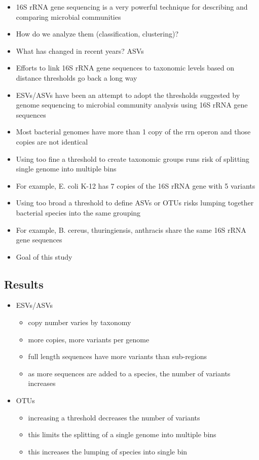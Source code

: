 \documentclass[
]{article}
\providecommand{\tightlist}{%
  \setlength{\itemsep}{0pt}\setlength{\parskip}{0pt}}
\begin{document}
\begin{itemize}
\item
  16S rRNA gene sequencing is a very powerful technique for describing
  and comparing microbial communities
\item
  How do we analyze them (classification, clustering)?
\item
  What has changed in recent years? ASVs
\item
  Efforts to link 16S rRNA gene sequences to taxonomic levels based on
  distance thresholds go back a long way
\item
  ESVs/ASVs have been an attempt to adopt the thresholds suggested by
  genome sequencing to microbial community analysis using 16S rRNA gene
  sequences
\item
  Most bacterial genomes have more than 1 copy of the rrn operon and
  those copies are not identical
\item
  Using too fine a threshold to create taxonomic groups runs risk of
  splitting single genome into multiple bins
\item
  For example, E. coli K-12 has 7 copies of the 16S rRNA gene with 5
  variants
\item
  Using too broad a threshold to define ASVs or OTUs risks lumping
  together bacterial species into the same grouping
\item
  For example, B. cereus, thuringiensis, anthracis share the same 16S
  rRNA gene sequences
\item
  Goal of this study
\end{itemize}

\newpage

\hypertarget{results}{%
\subsection{Results}\label{results}}

\begin{itemize}
\tightlist
\item
  ESVs/ASVs

  \begin{itemize}
  \tightlist
  \item
    copy number varies by taxonomy
  \item
    more copies, more variants per genome
  \item
    full length sequences have more variants than sub-regions
  \item
    as more sequences are added to a species, the number of variants
    increases
  \end{itemize}
\item
  OTUs

  \begin{itemize}
  \tightlist
  \item
    increasing a threshold decreases the number of variants
  \item
    this limits the splitting of a single genome into multiple bins
  \item
    this increases the lumping of species into single bin
  \end{itemize}
\end{itemize}
\end{document}
